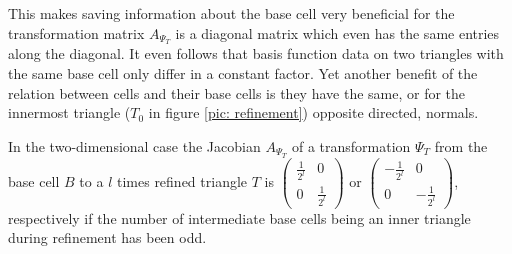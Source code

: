 This makes saving information about the base cell very beneficial for the transformation matrix $A_{\Psi_T}$ is a diagonal matrix which even has the same entries along the diagonal. It even follows that basis function data on two triangles with the same base cell only differ in a constant factor. Yet another benefit of the relation between cells and their base cells is they have the same, or for the innermost triangle ($T_0$ in figure \ref{pic: refinement}) opposite directed, normals.

\begin{example}\label{ex: leaf cell trafo}
In the two-dimensional case the Jacobian $A_{\Psi_T}$ of a transformation $\Psi_T$ from the base cell $B$ to a $l$ times refined triangle $T$ is $
	\begin{pmatrix}
		\frac 1 {2^l} & 0 \\ 0 & \frac 1 {2^l}
	\end{pmatrix} \text{ or }
	\begin{pmatrix}
		-\frac 1 {2^l} & 0 \\ 0 & -\frac 1 {2^l}
	\end{pmatrix}$, respectively if the number of intermediate base cells being an inner triangle during refinement  has been odd.


\end{example}
